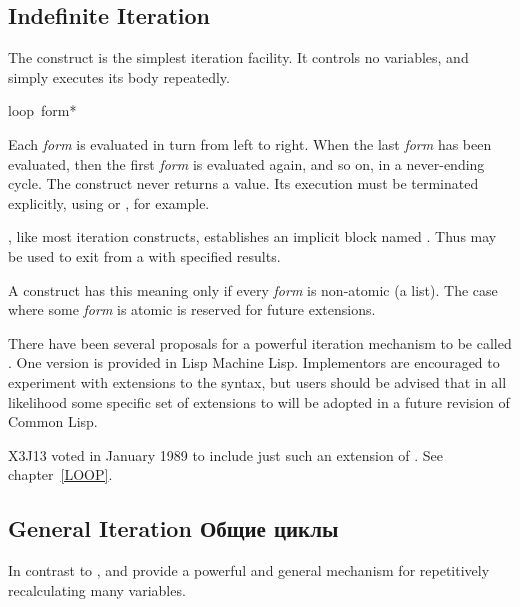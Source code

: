 \subsection{Indefinite Iteration}

The  construct is the simplest iteration facility.
It controls no variables, and simply executes its body repeatedly.

\begin{defmac}
loop {\,form}*

Each \emph{form} is evaluated in turn from left to right.
When the last \emph{form} has been evaluated, then the first \emph{form}
is evaluated again, and so on, in a never-ending cycle.
The  construct never returns a value.  Its execution must be terminated
explicitly, using  or , for example.

, like most iteration constructs,
establishes an implicit block named {\nil}.
Thus  may be used to exit from a  with specified results.

\begin{obsolete}
A  construct has this meaning only if every \emph{form} is
non-atomic (a list).  The case where some \emph{form} is
atomic is reserved for future extensions.

\beforenoterule
\begin{implementation}
There have been several proposals for a powerful iteration
mechanism to be called .  One version is provided in Lisp Machine Lisp.
Implementors are encouraged to experiment with extensions to the 
syntax, but users should be advised that in all likelihood some specific
set of extensions to  will be adopted in a future revision of Common Lisp.
\end{implementation}
\afternoterule
\end{obsolete}

\begin{new}
X3J13 voted in January 1989
to include just such an extension of .  See chapter~\ref{LOOP}.
\end{new}
\end{defmac}


\subsection{General Iteration Общие циклы}

In contrast to ,  and  provide a powerful
and general mechanism for repetitively recalculating many variables.

